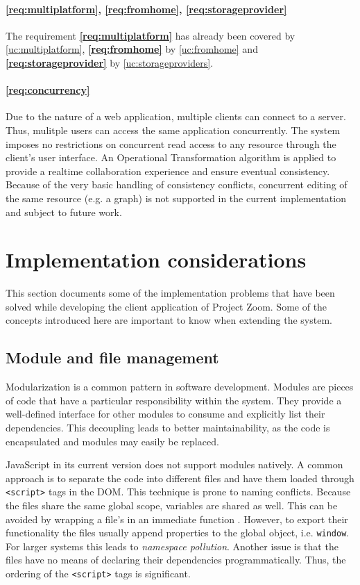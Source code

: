 \paragraph{\ref{req:multiplatform}, \ref{req:fromhome}, \ref{req:storageprovider}} The requirement \textbf{\ref{req:multiplatform}} has already been covered by \ref{uc:multiplatform}, \textbf{\ref{req:fromhome}} by \ref{uc:fromhome} and \textbf{\ref{req:storageprovider}} by \ref{uc:storageproviders}.

\paragraph{\ref{req:concurrency}} Due to the nature of a web application, multiple clients can connect to a server. Thus, mulitple users can access the same application concurrently. The system imposes no restrictions on concurrent read access to any resource through the client's user interface. An Operational Transformation algorithm is applied to provide a realtime collaboration experience and ensure eventual consistency. Because of the very basic handling of consistency conflicts, concurrent editing of the same resource (e.g. a graph) is not supported in the current implementation and subject to future work.

\section{Implementation considerations}

This section documents some of the implementation problems that have been solved while developing the client application of Project Zoom. Some of the concepts introduced here are important to know when extending the system.

\subsection{Module and file management}
Modularization is a common pattern in software development. Modules are pieces of code that have a particular responsibility within the system. They provide a well-defined interface for other modules to consume and explicitly list their dependencies. This decoupling leads to better maintainability, as the code is encapsulated and modules may easily be replaced. \cite{Osmani_2011}

JavaScript in its current version does not support modules natively. A common approach is to separate the code into different files and have them loaded through \texttt{<script>} tags in the DOM. This technique is prone to naming conflicts. Because the files share the same global scope, variables are shared as well. This can be avoided by wrapping a file's in an immediate function \cite{Resig_2013}. However, to export their functionality the files usually append properties to the global object, i.e. \texttt{window}. For larger systems this leads to \textit{namespace pollution}. Another issue is that the files have no means of declaring their dependencies programmatically. Thus, the ordering of the \texttt{<script>} tags is significant.

